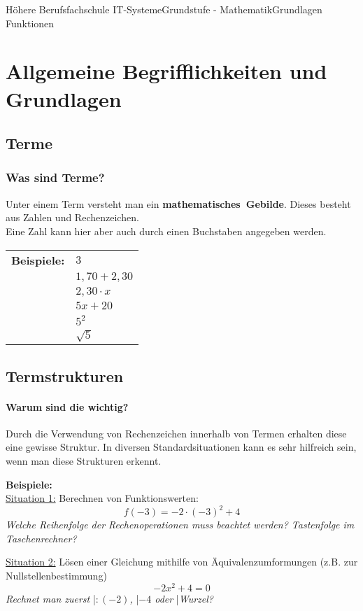 \documentclass[11pt,twocolumn,oneside,openany,headings=optiontotoc,11pt,numbers=noenddot]{article}
\begin{document}
	\begin{worksheet}{Höhere Berufsfachschule IT-Systeme}{Grundstufe - Mathematik}{Grundlagen Funktionen}
		\section{Allgemeine Begrifflichkeiten und Grundlagen}
		\subsection{Terme}
		\subsubsection*{Was sind Terme?} Unter einem Term versteht man ein \mbox{\textbf{mathematisches Gebilde}}. Dieses besteht aus Zahlen und Rechenzeichen.\\
		Eine Zahl kann hier aber auch durch einen Buchstaben angegeben werden.\\
		\par
		\begin{tabularx}{0.5\textwidth}{ll}
			\noindent
			\textbf{Beispiele:} & \(3\)\\
			& \(1,70+2,30\)\\
			& \(2,30\cdot x\)\\
			& \(5x + 20\)\\
			& \(5^2\)\\
			& \(\sqrt{5}\)\\
		\end{tabularx}
		\subsection{Termstrukturen}
		\paragraph{Warum sind die wichtig?}
		Durch die Verwendung von Rechenzeichen innerhalb von Termen erhalten diese eine gewisse Struktur. In diversen Standardsituationen kann es sehr hilfreich sein, wenn man diese Strukturen erkennt.
		\begin{framed}
			\noindent
			\textbf{Beispiele:}\\
			\underline{Situation 1:} Berechnen von Funktionswerten:
			\[f(-3) = -2\cdot (-3)^2 + 4\]
			\textit{Welche Reihenfolge der Rechenoperationen muss beachtet werden? Tastenfolge im Taschenrechner?}\\
			\par
			\underline{Situation 2:} Lösen einer Gleichung mithilfe von Äquivalenzumformungen (z.B. zur Nullstellenbestimmung)
			\[-2x^2 +4 = 0\]
			\textit{Rechnet man zuerst }|\textit{\(:(-2)\), }|\textit{\(-4\) oder }|\textit{\glqq{}Wurzel\grqq{}?}
		\end{framed}

\end{worksheet}
\end{document}
